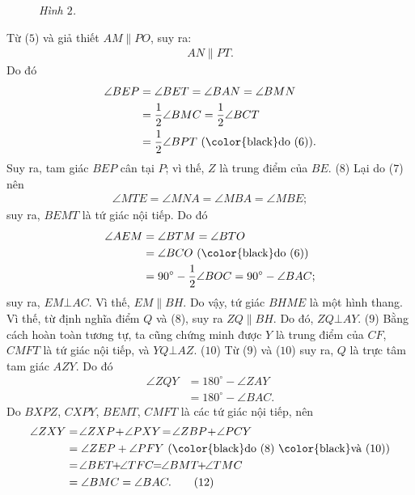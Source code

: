 \begin{multicols}{2}
\begin{figure}[H]
		\caption{\small\textit{\color{thachthuctoanhoc}Hình $2$.}}
		\vspace*{-5pt}
	\end{figure}
	Từ ($5$) và giả thiết $AM \parallel PO$, suy ra:
	\begin{align*}
		AN \parallel PT. \tag{$7$}
	\end{align*}
	Do đó
	\begin{align*}
		\angle BEP &= \angle BET = \angle BAN = \angle BMN \\
		&= \frac{1}{2}\angle BMC = \frac{1}{2}\angle BCT \\
		&= \frac{1}{2}\angle BPT\,\,({\text{\color{black}do }}(6)).
	\end{align*}
	Suy ra, tam giác $BEP$ cân tại $P$; vì thế, $Z$ là trung điểm của $BE$. \hfill ($8$)
	\vskip 0.05cm
	Lại do ($7$) nên
	\begin{align*}
		\angle MTE = \angle MNA = \angle MBA = \angle MBE;
	\end{align*}
	suy ra, $BEMT$ là tứ giác nội tiếp. Do đó
	\begin{align*}
			\angle AEM &= \angle BTM = \angle BTO \\
			&= \angle BCO \,\,({\text{\color{black}do }}(6))\\
			 &= 90^\circ - \frac{1}{2}\angle BOC = 90^\circ - \angle BAC;
	\end{align*}
	suy ra, $EM \bot AC$. Vì thế, $EM \parallel BH$. Do vậy, tứ giác $BHME$ là một hình thang. Vì thế, từ định nghĩa điểm $Q$ và ($8$), suy ra $ZQ \parallel BH$. Do đó, $ZQ \bot AY$. \hfill ($9$)
	\vskip 0.05cm
	Bằng cách hoàn toàn tương tự, ta cũng chứng minh được $Y$ là trung điểm của $CF$, $CMFT$ là tứ giác nội tiếp, và $YQ \bot AZ$. \hfill ($10$)
	\vskip 0.05cm
	Từ ($9$) và ($10$) suy ra, $Q$ là trực tâm tam giác $AZY$. Do đó
	\begin{align*}
		\angle ZQY &= 180^\circ - \angle ZAY \\
		&= 180^\circ - \angle BAC. \tag{$11$}
	\end{align*}
	Do $BXPZ$, $CXPY$, $BEMT$, $CMFT$ là các tứ giác nội tiếp, nên
	\begin{align*}
			\angle ZXY &= \!\angle ZXP \!+\! \angle PXY \!=\! \angle ZBP \!+\! \angle PCY\\
			&= \angle ZEP + \angle PFY \,\,({\text{\color{black}do }}(8) \,\,\text{\color{black}và }(10))\\
			&= \!\angle BET \!\!+\!\! \angle TFC \!\!=\!\! \angle BMT \!\!+\!\! \angle TMC\\
			&= \angle BMC = \angle BAC.\tag{$12$}

\end{align*}
\end{multicols}
